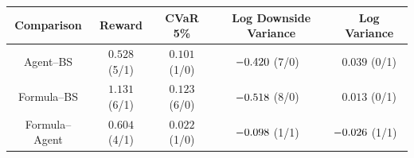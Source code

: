 \begingroup
\renewcommand{\arraystretch}{1.18}
\setlength{\tabcolsep}{7pt}
\begin{tabular}{@{}ccccc@{}}
\toprule
Comparison & Reward & CVaR 5\% & Log Downside Variance & Log Variance \\
\midrule
Agent--BS & $0.528$ (5/1) & $0.101$ (1/0) & $\mathllap{-}0.420$ (7/0) & $0.039$ (0/1) \\
Formula--BS & $1.131$ (6/1) & $0.123$ (6/0) & $\mathllap{-}0.518$ (8/0) & $0.013$ (0/1) \\
Formula--Agent & $0.604$ (4/1) & $0.022$ (1/0) & $\mathllap{-}0.098$ (1/1) & $\mathllap{-}0.026$ (1/1) \\
\bottomrule
\end{tabular}
\endgroup
